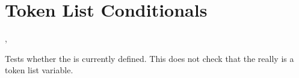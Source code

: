 \documentclass[oneside]{book}
\begin{document}
%

\section{Token List Conditionals}

\begin{function}{\TlIfExist,\TlIfExistTF}
\begin{syntax}
 
   
\end{syntax}
Tests whether the  is currently defined.  This does not
check that the  really is a token list variable.
\end{function}
\end{document}
